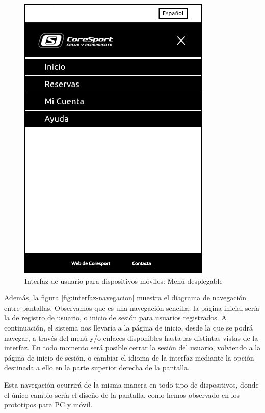 \begin{figure}[h!]
\centering
  \includegraphics[scale=.50]{img/interfaz/menu-movil.jpg}
  \caption{Interfaz de usuario para dispositivos móviles: Menú desplegable}
  \label{fig:interfaz-menu-movil}
\end{figure}


Además, la figura \ref{fig:interfaz-navegacion} muestra el diagrama de navegación entre pantallas. Observamos que es una navegación sencilla; la página inicial sería la de registro de usuario, o inicio de sesión para usuarios registrados. A continuación, el sistema nos llevaría a la página de inicio, desde la que se podrá navegar, a través del menú y/o enlaces disponibles hasta las distintas vistas de la interfaz. En todo momento será posible cerrar la sesión del usuario, volviendo a la página de inicio de sesión, o cambiar el idioma de la interfaz mediante la opción destinada a ello en la parte superior derecha de la pantalla. 


Esta navegación ocurrirá de la misma manera en todo tipo de dispositivos, donde el único cambio sería el diseño de la pantalla, como hemos observado en los prototipos para PC y móvil.


